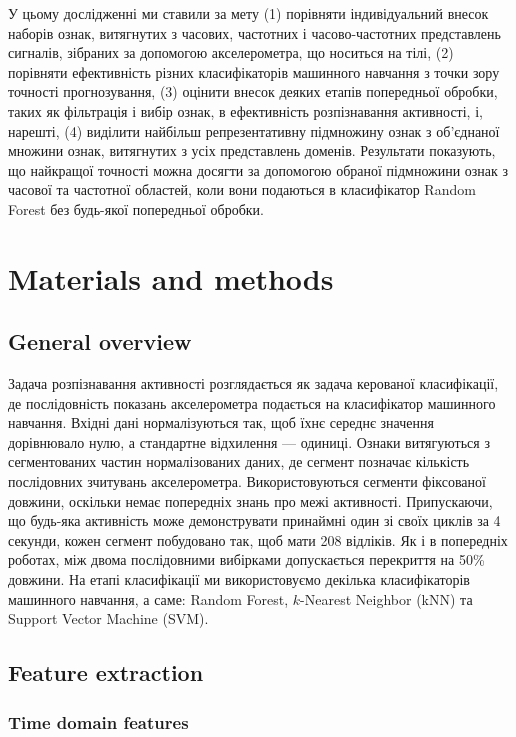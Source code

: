 \documentclass[]{iptconf}
\begin{document}
У цьому дослідженні ми ставили за мету (1) порівняти індивідуальний внесок наборів ознак, витягнутих з часових, частотних і часово-частотних представлень сигналів, зібраних за допомогою акселерометра, що носиться на тілі, (2) порівняти ефективність різних класифікаторів машинного навчання з точки зору точності прогнозування, (3) оцінити внесок деяких етапів попередньої обробки, таких як фільтрація і вибір ознак, в ефективність розпізнавання активності, і, нарешті, (4) виділити найбільш репрезентативну підмножину ознак з об'єднаної множини ознак, витягнутих з усіх представлень доменів. Результати показують, що найкращої точності можна досягти за допомогою обраної підмножини ознак з часової та частотної областей, коли вони подаються в класифікатор Random Forest без будь-якої попередньої обробки.


\section{Materials and methods}

\subsection{General overview}

Задача розпізнавання активності розглядається як задача керованої класифікації, де послідовність показань акселерометра подається на класифікатор машинного навчання. Вхідні дані нормалізуються так, щоб їхнє середнє значення дорівнювало нулю, а стандартне відхилення --- одиниці. Ознаки витягуються з сегментованих частин нормалізованих даних, де сегмент позначає кількість послідовних зчитувань акселерометра. Використовуються сегменти фіксованої довжини, оскільки немає попередніх знань про межі активності. Припускаючи, що будь-яка активність може демонструвати принаймні один зі своїх циклів за 4 секунди, кожен сегмент побудовано так, щоб мати 208 відліків. Як і в попередніх роботах, між двома послідовними вибірками допускається перекриття на 50\% довжини. На етапі класифікації ми використовуємо декілька класифікаторів машинного навчання, а саме: Random Forest, $k$-Nearest Neighbor (kNN) та Support Vector Machine (SVM).


\subsection{Feature extraction}

\subsubsection{Time domain features}
\end{document}
